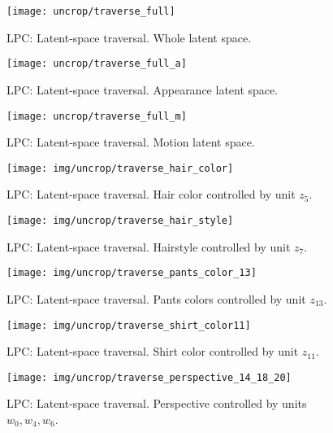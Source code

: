 \newcommand{\boximgc}[2]{\boximg{}{#1}{uncrop/#2}}

\begin{figure}[tb]
  \texttt{[image: uncrop/traverse\_full]}
   \caption{LPC: Latent-space traversal. Whole latent space.}
   \label{fig:traverse_full}
\end{figure}

\begin{figure}[tb]
  \texttt{[image: uncrop/traverse\_full\_a]}
   \caption{LPC: Latent-space traversal. Appearance latent space.}
   \label{fig:traverse_full_a}
\end{figure}

\begin{figure}[tb]
  \texttt{[image: uncrop/traverse\_full\_m]}
   \caption{LPC: Latent-space traversal. Motion latent space.}
   \label{fig:traverse_full_m}
\end{figure}

\begin{figure}[tb]
  \texttt{[image: img/uncrop/traverse\_hair\_color]}
   \caption{LPC: Latent-space traversal. Hair color controlled by unit $z_5$.}
   \label{fig:traverse_hair_color}
\end{figure}

\begin{figure}[tb]
  \texttt{[image: img/uncrop/traverse\_hair\_style]}
   \caption{LPC: Latent-space traversal. Hairstyle controlled by unit $z_7$.}
   \label{fig:traverse_hair_style}
\end{figure}

\begin{figure}[tb]
  \texttt{[image: img/uncrop/traverse\_pants\_color\_13]}
   \caption{LPC: Latent-space traversal. Pants colors controlled by unit $z_{13}$.}
   \label{fig:traverse_pants_color_13}
\end{figure}

\begin{figure}[tb]
  \texttt{[image: img/uncrop/traverse\_shirt\_color11]}
   \caption{LPC: Latent-space traversal. Shirt color controlled by unit $z_{11}$.}
   \label{fig:traverse_shirt_color11}
\end{figure}

\begin{figure}[tb]
  \texttt{[image: img/uncrop/traverse\_perspective\_14\_18\_20]}
   \caption{LPC: Latent-space traversal. Perspective controlled by units $w_0,w_4,w_6$.}
   \label{fig:traverse_perspective_14_18_20}
\end{figure}

